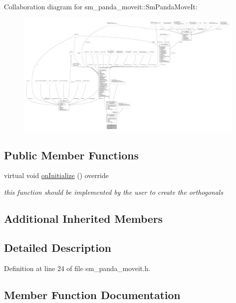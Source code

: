 Collaboration diagram for sm\+\_\+panda\+\_\+moveit\+:\+:Sm\+Panda\+Move\+It\+:
\nopagebreak
\begin{figure}[H]
\begin{center}
\leavevmode
\includegraphics[width=350pt]{structsm__panda__moveit_1_1SmPandaMoveIt__coll__graph}
\end{center}
\end{figure}
\subsection*{Public Member Functions}
\begin{DoxyCompactItemize}
\item 
virtual void \hyperlink{structsm__panda__moveit_1_1SmPandaMoveIt_afc86ff7c7c35e8e714751c898ab41627}{on\+Initialize} () override
\begin{DoxyCompactList}\small\item\em this function should be implemented by the user to create the orthogonals \end{DoxyCompactList}\end{DoxyCompactItemize}
\subsection*{Additional Inherited Members}


\subsection{Detailed Description}


Definition at line 24 of file sm\+\_\+panda\+\_\+moveit.\+h.



\subsection{Member Function Documentation}
\mbox{\label{structsm__panda__moveit_1_1SmPandaMoveIt_afc86ff7c7c35e8e714751c898ab41627}} 
